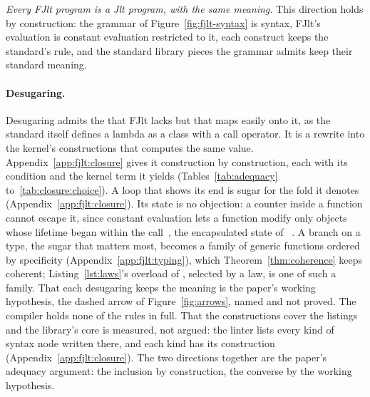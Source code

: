 \emph{Every FJlt program is a Jlt program, with the same meaning.}
This direction holds by construction: the grammar of Figure~\ref{fig:fjlt-syntax} is \Cpp{} syntax, FJlt's evaluation is constant evaluation restricted to it, each construct keeps the standard's rule, and the standard library pieces the grammar admits keep their standard meaning.

\paragraph{Desugaring.}
\label{sec:fjlt:desugaring}
Desugaring admits the \Cpp{} that FJlt lacks but that maps easily onto it, as the standard itself defines a lambda as a class with a call operator.
It is a rewrite into the kernel's constructions that computes the same value.
Appendix~\ref{app:fjlt:closure} gives it construction by construction, each with its condition and the kernel term it yields (Tables~\ref{tab:adequacy} to~\ref{tab:closure:choice}).
A loop that shows its end is sugar for the fold it denotes (Appendix~\ref{app:fjlt:closure}).
Its state is no objection: a counter inside a  function cannot escape it, since constant evaluation lets a function modify only objects whose lifetime began within the call~\cite[{\texttt{expr.const}}]{cpp23standard}, the encapsulated state of ~\cite{launchbury1994lazy}.
A branch on a type, the sugar that matters most, becomes a family of generic functions ordered by specificity (Appendix~\ref{app:fjlt:typing}), which Theorem~\ref{thm:coherence} keeps coherent; Listing~\ref{lst:laws}'s overload of , selected by a law, is one of such a family.
That each desugaring keeps the meaning is the paper's working hypothesis, the dashed arrow of Figure~\ref{fig:arrows}, named and not proved.
The compiler holds none of the rules in full.
That the constructions cover the listings and the library's core is measured, not argued: the linter lists every kind of syntax node written there, and each kind has its construction (Appendix~\ref{app:fjlt:closure}).
The two directions together are the paper's adequacy argument: the inclusion by construction, the converse by the working hypothesis.
